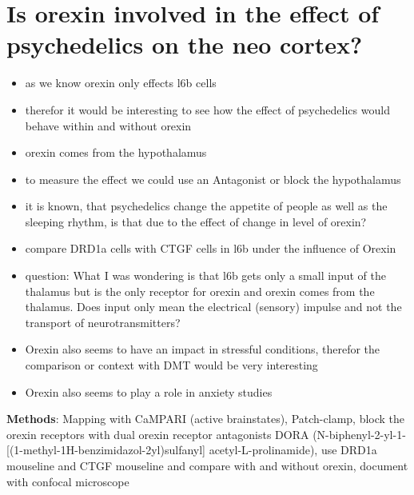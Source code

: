 \documentclass[12pt, a4paper, openany]{article}
\begin{document}
\section{Is orexin involved in the effect of psychedelics on the neo cortex?}
\begin{itemize}
\setlength\itemsep{0em}
\item as we know orexin only effects l6b cells
\item therefor it would be interesting to see how the effect of psychedelics would behave within and without orexin 
\item orexin comes from the hypothalamus
\item to measure the effect we could use an Antagonist or block the hypothalamus 
\item it is known, that psychedelics change the appetite of people as well as the sleeping rhythm, is that due to the effect of change in level of orexin?
\item compare DRD1a cells with CTGF cells in l6b under the influence of Orexin 
\item question: What I was wondering is that l6b gets only a small input of the thalamus but is the only receptor for orexin and orexin comes from the thalamus. Does input only mean the electrical (sensory) impulse and not the transport of neurotransmitters?
\item Orexin also seems to have an impact in stressful conditions, therefor the comparison or context with DMT would be very interesting 
\item Orexin also seems to play a role in anxiety studies 
\end{itemize} 
\textbf{Methods}: Mapping with CaMPARI (active brainstates), Patch-clamp, block the orexin receptors with dual orexin receptor antagonists DORA (N-biphenyl-2-yl-1-[(1-methyl-1H-benzimidazol-2yl)sulfanyl] acetyl-L-prolinamide), use DRD1a mouseline and CTGF mouseline and compare with and without orexin, document with confocal microscope\\
\end{document}
